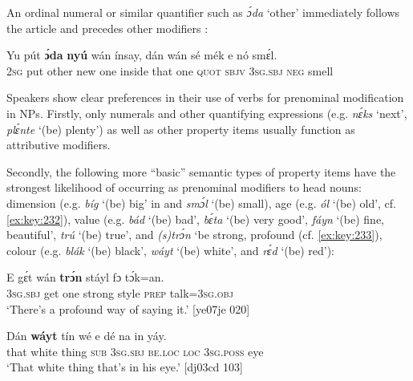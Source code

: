 An ordinal numeral or similar quantifier such as \textit{ɔ́da} ‘other’ immediately follows the article and precedes other modifiers :


\ea%
    \label{ex:key:232}
    \gll Yu  pút  \textbf{ɔ́da}    \textbf{nyú}    wán    ínsay,  dán    wán    sé
mék    e    nó  smɛ́l.\\
\textsc{2sg}  put  other  new    one    inside  that    one    \textsc{quot}
\textsc{sbjv}    \textsc{3sg.sbj}  \textsc{neg}  smell\\

\glt 
{} 
\z

Speakers show clear preferences in their use of verbs for prenominal modification in NPs. Firstly, only numerals and other quantifying expressions (e.g. \textit{nɛ́ks} ‘next’, \textit{plɛ́nte} ‘(be) plenty’) as well as other property items usually function as attributive modifiers. 


Secondly, the following more “basic” semantic types of property items have the strongest likelihood of occurring as prenominal modifiers to head nouns: dimension (e.g. \textit{bíg} ‘(be) big’ in  and \textit{smɔ́l} ‘(be) small), age (e.g. \textit{ól} ‘(be) old’, cf. \ref{ex:key:232}), value (e.g. \textit{bád} ‘(be) bad’, \textit{bɛ́ta} ‘(be) very good’, \textit{fáyn} ‘(be) fine, beautiful’, \textit{trú} ‘(be) true’, and \textit{(s)trɔ́n} ‘be strong, profound (cf. \ref{ex:key:233}), colour (e.g. \textit{blák} ‘(be) black’, \textit{wáyt} ‘(be) white’, and \textit{rɛ́d} ‘(be) red’):



\ea%
    \label{ex:key:233}
    \gll E    gɛ́t  wán  \textbf{trɔ́n}    stáyl  fɔ  tɔ́k=an.\\
\textsc{3sg.sbj}  get  one  strong  style  \textsc{prep}  talk=\textsc{3sg.obj}\\

\glt ‘There’s a profound way of saying it.’ [ye07je 020]
\z


\ea%
    \label{ex:key:234}
    \gll Dán  \textbf{wáyt}  tín    wé  e    dé    na  in    yáy.\\
that  white  thing  \textsc{sub}  \textsc{3sg.sbj}  \textsc{be.loc}  \textsc{loc}  \textsc{3sg.poss}  eye\\

\glt ‘That white thing that’s in his eye.’ [dj03cd 103]
\z


